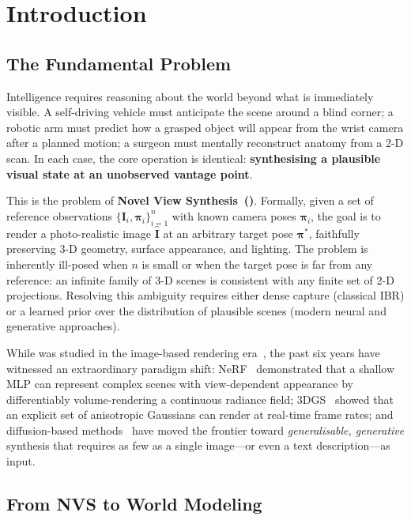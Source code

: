\section{Introduction}
\label{sec:intro}

\subsection{The Fundamental Problem}

Intelligence requires reasoning about the world beyond what is immediately
visible.
A self-driving vehicle must anticipate the scene around a blind corner;
a robotic arm must predict how a grasped object will appear from the wrist
camera after a planned motion; a surgeon must mentally reconstruct
anatomy from a 2-D scan.
In each case, the core operation is identical: \textbf{synthesising a
plausible visual state at an unobserved vantage point}.

This is the problem of \textbf{Novel View Synthesis~(\nvs)}.
Formally, given a set of reference observations
$\{\mathbf{I}_i, \boldsymbol{\pi}_i\}_{i=1}^{n}$ with known camera poses
$\boldsymbol{\pi}_i$, the goal is to render a photo-realistic image
$\hat{\mathbf{I}}$ at an arbitrary target pose $\boldsymbol{\pi}^{*}$,
faithfully preserving 3-D geometry, surface appearance, and lighting.
The problem is inherently ill-posed when $n$ is small or when the target
pose is far from any reference: an infinite family of 3-D scenes
is consistent with any finite set of 2-D projections.
Resolving this ambiguity requires either dense capture (classical IBR) or
a learned prior over the distribution of plausible scenes (modern neural
and generative approaches).

While \nvs{} was studied in the image-based rendering
era~\citep{levoy1996light,mcmillan1995plenoptic,chen1993view,debevec1996modeling},
the past six years have witnessed an extraordinary paradigm shift:
NeRF~\citep{mildenhall2020nerf} demonstrated that a shallow MLP can represent
complex scenes with view-dependent appearance by differentiably volume-rendering
a continuous radiance field;
3DGS~\citep{kerbl2023gaussian} showed that an explicit set of anisotropic
Gaussians can render at real-time frame rates;
and diffusion-based methods~\citep{liu2023zero1to3,poole2023dreamfusion,yu2024viewcrafter}
have moved the frontier toward \emph{generalisable, generative} synthesis
that requires as few as a single image---or even a text description---as input.

\subsection{From NVS to World Modeling}

